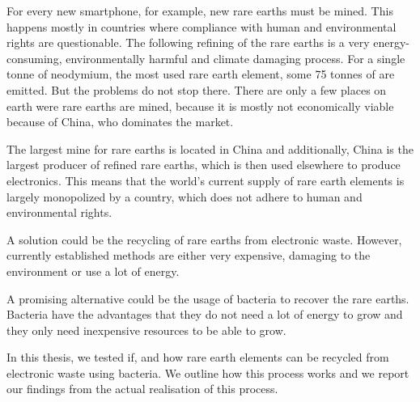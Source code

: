 For every new smartphone, for example, new rare earths must be mined.
This happens mostly in countries where compliance with human and environmental rights are questionable.
The following refining of the rare earths is a very energy-consuming, environmentally harmful and climate damaging process.
For a single tonne of neodymium, the most used rare earth element, some 75 tonnes of  are emitted.
But the problems do not stop there.
There are only a few places on earth were rare earths are mined, because it is mostly not economically viable because of China, who dominates the market.

The largest mine for rare earths is located in China and additionally, China is the largest producer of refined rare earths, which is then used elsewhere to produce electronics.
This means that the world's current supply of rare earth elements is largely monopolized by a country, which does not adhere to human and environmental rights.

A solution could be the recycling of rare earths from electronic waste.
However, currently established methods are either very expensive, damaging to the environment or use a lot of energy.

A promising alternative could be the usage of bacteria to recover the rare earths.
Bacteria have the advantages that they do not need a lot of energy to grow and they only need inexpensive resources to be able to grow.

In this thesis, we tested if, and how rare earth elements can be recycled from electronic waste using bacteria.
We outline how this process works and we report our findings from the actual realisation of this process.